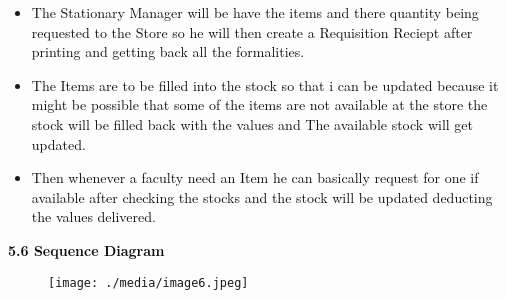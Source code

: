 \documentclass[12pt]{report}
\renewcommand{\_}{\kern-1.5pt\textunderscore\kern-1.5pt}
\begin{document}
\vspace{\baselineskip}
\begin{itemize}
	\item \textcolor[HTML]{0D0D0D}{The Stationary Manager will be have the items and there quantity being requested to the Store so he will then create a Requisition Reciept after printing and getting back all the formalities.}\par


\vspace{\baselineskip}
	\item \textcolor[HTML]{0D0D0D}{The Items are to be filled into the stock so that i can be updated because it might be possible that some of the items are not available at the store the stock will be filled back with the values and The available stock will get updated.}\par


\vspace{\baselineskip}
	\item \textcolor[HTML]{0D0D0D}{Then whenever a faculty need an Item he can basically request for one if available after checking the stocks and the stock will be updated deducting the values delivered.}
\end{itemize}\par


\vspace{\baselineskip}

\vspace{\baselineskip}
\begin{adjustwidth}{0.3in}{0.84in}
\begin{justify}
{\fontsize{14pt}{16.8pt}\selectfont \textbf{\textcolor[HTML]{0D0D0D}{5.6 Sequence Diagram}}\par}
\end{justify}\par

\end{adjustwidth}


\vspace{\baselineskip}

\vspace{\baselineskip}



\begin{figure}[H]
	\begin{Center}
		\texttt{[image: ./media/image6.jpeg]}
	\end{Center}
\end{figure}
\end{document}
